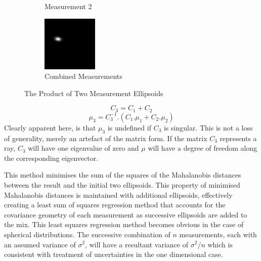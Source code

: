 \documentclass{article}
\begin{document}
\begin{figure}
\begin{subfigure}{.3\textwidth}
          \caption{Measurement 2}
          \label{fig:uncProdsub2}
        \end{subfigure}
        \begin{subfigure}{.3\textwidth}
          \centering
          \includegraphics[width=.8\linewidth]{images/GaussianLine3.png}
          \caption{Combined Measurements}
          \label{fig:uncProdsub3}
        \end{subfigure}
        \caption{The Product of Two Measurement Ellipsoids}
        \label{fig:uncProd}
        \end{figure}

        \begin{equation}
        C_3 = C_1+C_2
        \end{equation}
        \begin{equation}
        \mu_3 = C_3^{-1} . (C_1.\mu_1 + C_2.\mu_2)
        \end{equation}
        Clearly apparent here, is that \(\mu_3\) is undefined if \(C_3\) is singular.
        This is not a loss of generality, merely an artefact of the matrix form.  If the matrix \(C_3\) represents a ray, \(C_3\) will have one eigenvalue of zero and \(\mu\) will have a degree of freedom along the corresponding eigenvector.
        
        This method minimises the sum of the squares of the Mahalanobis distances between the result and the initial two ellipsoids.  This property of minimised Mahalanobis distances is maintained with additional ellipsoids, effectively creating a least sum of squares regression method that accounts for the covariance geometry of each measurement as successive ellipsoids are added to the mix.
        This least squares regression method becomes obvious in the case of spherical distributions.  The successive combination of \(n\) measurements, each with an assumed variance of \(\sigma^2\), will have a resultant variance of \(\sigma^2/n\) which is consistent with treatment of uncertainties in the one dimensional case.
\end{document}
